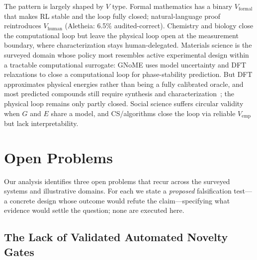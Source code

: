 \documentclass{article}
\begin{document}
\noindent The pattern is largely shaped by $V$ type. Formal mathematics has a binary $V_\text{formal}$ that makes RL stable and the loop fully closed; natural-language proof reintroduces $V_\text{human}$ (Aletheia: 6.5\% audited-correct). Chemistry and biology close the computational loop but leave the physical loop open at the measurement boundary, where characterization stays human-delegated. Materials science is the surveyed domain whose policy most resembles active experimental design within a tractable computational surrogate: GNoME uses model uncertainty and DFT relaxations to close a computational loop for phase-stability prediction. But DFT approximates physical energies rather than being a fully calibrated oracle, and most predicted compounds still require synthesis and characterization~\citep{cheetham2024gnome}; the physical loop remains only partly closed. Social science suffers circular validity when $G$ and $E$ share a model, and CS/algorithms close the loop via reliable $V_\text{emp}$ but lack interpretability.


\section{Open Problems}
\label{sec:openproblems}

Our analysis identifies three open problems that recur across the surveyed systems and illustrative domains. For each we state a \emph{proposed} falsification test---a concrete design whose outcome would refute the claim---specifying what evidence would settle the question; none are executed here.

\subsection{The Lack of Validated Automated Novelty Gates}
\label{sec:op1}
\end{document}
